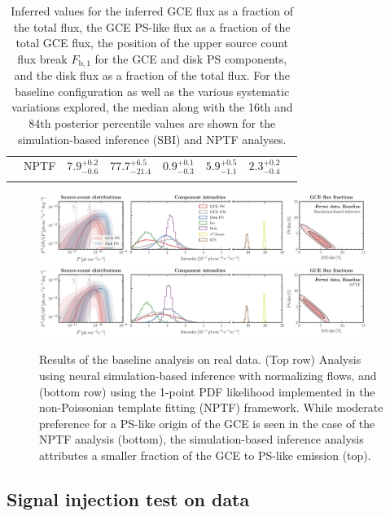 \documentclass[prd,aps,10pt,nofootinbib,twocolumn,superscriptaddress,preprintnumbers,balancelastpage,longbibliography,floatfix]{revtex4-2}
\newcommand\Bstrut{\rule[-1.6ex]{0pt}{0pt}}   %
\begin{document}
\begin{table}[!t]
\begin{center}
\begin{tabular}{C{2.3cm}C{2cm}|C{2cm}C{2cm}C{2.2cm}C{2cm}C{2.2cm}C{2cm}}
& NPTF & $7.9^{+0.2}_{-0.6}$ & $77.7^{+6.5}_{-21.4}$ & $0.9^{+0.1}_{-0.3}$ & $5.9^{+0.5}_{-1.1}$ & $2.3^{+0.2}_{-0.4}$\Bstrut &\\
\botrule
\end{tabular}
\end{center}
\caption{Inferred values for the inferred GCE flux as a fraction of the total flux, the GCE PS-like flux as a fraction of the total GCE flux, the position of the upper source count flux break $F_{\mathrm{b}, 1}$ for the GCE and disk PS components, and the disk flux as a fraction of the total flux. For the baseline configuration as well as the various systematic variations explored, the median along with the 16th and 84th posterior percentile values are shown for the simulation-based inference (SBI) and NPTF analyses.}
\label{tab:results}
\end{table}    
%

%
\begin{figure}[!htbp]
\centering
\includegraphics[width=0.95\textwidth]{data_fid_sbi.pdf}
\includegraphics[width=0.95\textwidth]{data_fid_nptf.pdf}
\caption{Results of the baseline analysis on real \Fermi data. {(Top row)} Analysis using neural simulation-based inference with normalizing flows, and {(bottom row)} using the 1-point PDF likelihood implemented in the non-Poissonian template fitting (NPTF) framework. While moderate preference for a PS-like origin of the GCE is seen in the case of the NPTF analysis (bottom), the simulation-based inference analysis attributes a smaller fraction of the GCE to PS-like emission (top).}
\label{fig:fid_data}
\end{figure}
%

\subsection{Signal injection test on \Fermi data}
\label{sec:sig-injection}
\end{document}
